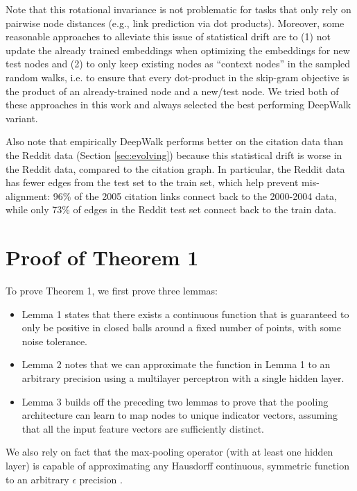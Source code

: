 Note that this rotational invariance is not problematic for tasks that only rely on pairwise node distances (e.g., link prediction via dot products). 
Moreover, some reasonable approaches to alleviate this issue of statistical drift are to (1) not update the already trained embeddings when optimizing the embeddings for new test nodes and (2) to only keep existing nodes as ``context nodes'' in the sampled random walks, i.e. to ensure that every dot-product in the skip-gram objective is the product of an already-trained node and a new/test node.
We tried both of these approaches in this work and always selected the best performing DeepWalk variant. 

Also note that empirically DeepWalk performs better on the citation data than the Reddit data (Section \ref{sec:evolving}) because this statistical drift is worse in the Reddit data, compared to the citation graph.
In particular, the Reddit data has fewer edges from the test set to the train set, which help prevent mis-alignment: 96\% of the 2005 citation links connect back to the 2000-2004 data, while only 73\% of edges in the Reddit test set connect back to the train data. 

\section{Proof of Theorem 1}

\newcommand{\R}{\mathbb{R}}
To prove Theorem 1, we first prove three lemmas:
\begin{itemize}
\item
Lemma 1 states that there exists a continuous function that is guaranteed to only be positive in closed balls around a fixed number of points, with some noise tolerance. 
\item
Lemma 2 notes that we can approximate the function in Lemma 1 to an arbitrary precision using a multilayer perceptron with a single hidden layer.
\item
Lemma 3 builds off the preceding two lemmas to prove that the pooling architecture can learn to map nodes to unique indicator vectors, assuming that all the input feature vectors are sufficiently distinct. 
\end{itemize}
We also rely on fact that the max-pooling operator (with at least one hidden layer) is capable of approximating any Hausdorff continuous, symmetric function to an arbitrary $\epsilon$ precision \cite{qi2016pointnet}.

